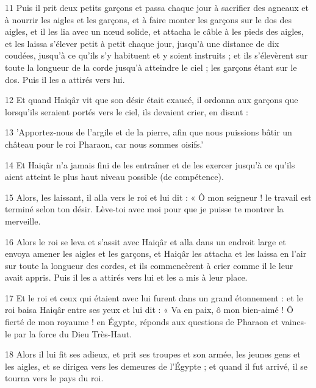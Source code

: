 \par 11 Puis il prit deux petits garçons et passa chaque jour à sacrifier des agneaux et à nourrir les aigles et les garçons, et à faire monter les garçons sur le dos des aigles, et il les lia avec un nœud solide, et attacha le câble à les pieds des aigles, et les laissa s'élever petit à petit chaque jour, jusqu'à une distance de dix coudées, jusqu'à ce qu'ils s'y habituent et y soient instruits ; et ils s'élevèrent sur toute la longueur de la corde jusqu'à atteindre le ciel ; les garçons étant sur le dos. Puis il les a attirés vers lui.

\par 12 Et quand Haiqâr vit que son désir était exaucé, il ordonna aux garçons que lorsqu'ils seraient portés vers le ciel, ils devaient crier, en disant :

\par 13 'Apportez-nous de l'argile et de la pierre, afin que nous puissions bâtir un château pour le roi Pharaon, car nous sommes oisifs.'

\par 14 Et Haiqâr n'a jamais fini de les entraîner et de les exercer jusqu'à ce qu'ils aient atteint le plus haut niveau possible (de compétence).

\par 15 Alors, les laissant, il alla vers le roi et lui dit : « Ô mon seigneur ! le travail est terminé selon ton désir. Lève-toi avec moi pour que je puisse te montrer la merveille.

\par 16 Alors le roi se leva et s'assit avec Haiqâr et alla dans un endroit large et envoya amener les aigles et les garçons, et Haiqâr les attacha et les laissa en l'air sur toute la longueur des cordes, et ils commencèrent à crier comme il le leur avait appris. Puis il les a attirés vers lui et les a mis à leur place.

\par 17 Et le roi et ceux qui étaient avec lui furent dans un grand étonnement : et le roi baisa Haiqâr entre ses yeux et lui dit : « Va en paix, ô mon bien-aimé ! Ô fierté de mon royaume ! en Égypte, réponds aux questions de Pharaon et vaincs-le par la force du Dieu Très-Haut.

\par 18 Alors il lui fit ses adieux, et prit ses troupes et son armée, les jeunes gens et les aigles, et se dirigea vers les demeures de l'Égypte ; et quand il fut arrivé, il se tourna vers le pays du roi.

